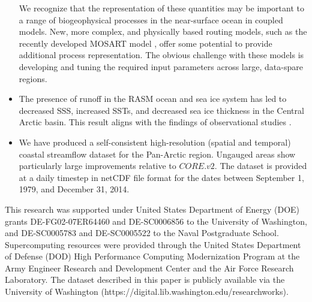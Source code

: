 \documentclass[jgrga, draft]{agutex}
\begin{document}
\begin{article}
\begin{itemize}[leftmargin=+.5in]
  We recognize that the representation of these quantities may be important to a range of biogeophysical processes in the near-surface ocean in coupled models.
  New, more complex, and physically based routing models, such as the recently developed MOSART model \citep{Li_2013}, offer some potential to provide additional process representation.
  The obvious challenge with these models is developing and tuning the required input parameters across large, data-spare regions.
  \item The presence of runoff in the RASM ocean and sea ice system has led to decreased SSS, increased SSTs, and decreased sea ice thickness in the Central Arctic basin.
  This result aligns with the findings of observational studies \citep[e.g.][]{Morison_2012}.
  \item We have produced a self-consistent high-resolution (spatial and temporal) coastal streamflow dataset for the Pan-Arctic region.
  Ungauged areas show particularly large improvements relative to $CORE.v2$.
  The dataset is provided at a daily timestep in netCDF file format for the dates between September 1, 1979, and December 31, 2014.
\end{itemize}


%
%
%


\begin{acknowledgments}
This research was supported under United States Department of Energy (DOE) grants DE-FG02-07ER64460 and DE-SC0006856 to the University of Washington, and DE-SC0005783 and DE-SC0005522 to the Naval Postgraduate School.
Supercomputing resources were provided through the United States Department of Defense (DOD) High Performance Computing Modernization Program at the Army Engineer Research and Development Center and the Air Force Research Laboratory.
The dataset described in this paper is publicly available via the University of Washington (https://digital.lib.washington.edu/researchworks).
\end{acknowledgments}





%
%
\end{article}
\end{document}
